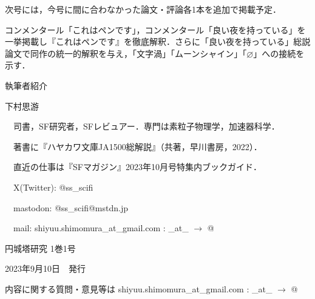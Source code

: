 \documentclass[10pt, a5paper, twoside]{jsarticle}
\theoremstyle{definition}
\begin{document}
	\vspace{15mm}

	\begin{screen}
		
		次号には，今号に間に合わなかった論文・評論各1本を追加で掲載予定．

		コンメンタール「これはペンです」，コンメンタール「良い夜を持っている」を一挙掲載し『これはペンです』を徹底解釈．さらに「良い夜を持っている」総説論文で同作の統一的解釈を与え，「文字渦」「ムーンシャイン」「$\varnothing$」への接続を示す．

	\end{screen}

	\newpage

	{\large 執筆者紹介}

	\vspace{3mm}

	下村思游

	　司書，SF研究者，SFレビュアー．専門は素粒子物理学，加速器科学．

	　著書に『ハヤカワ文庫JA1500総解説』（共著，早川書房，2022）．

	　直近の仕事は『SFマガジン』2023年10月号特集内ブックガイド．

	　X(Twitter): @ss\_scifi

	　mastodon: @ss\_scifi@mstdn.jp

	　mail: shiyuu.shimomura\_at\_gmail.com : \_at\_ $\rightarrow$ @

	\vfill

	\hrulefill

	\center

	{\Large 円城塔研究 1巻1号}

	2023年9月10日　発行


	\hrulefill

	内容に関する質問・意見等は shiyuu.shimomura\_at\_gmail.com : \_at\_ $\rightarrow$ @
\end{document}
